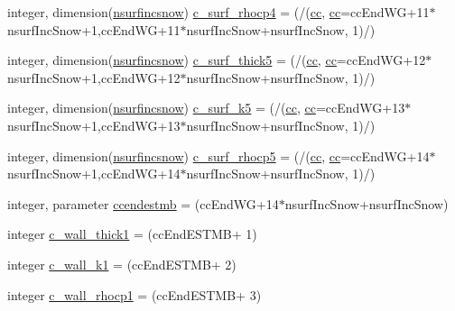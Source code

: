 \begin{DoxyCompactItemize}
\item 
integer, dimension(\hyperlink{namespaceallocatearray_af4d113f332b6759cfa22271140c9162d}{nsurfincsnow}) \hyperlink{namespaceallocatearray_aeb83627142153ed809b4e704bd02f508}{c\+\_\+surf\+\_\+rhocp4} = (/(\hyperlink{namespaceallocatearray_ac863c81704eb507dee10f5e10741e10c}{cc}, \hyperlink{namespaceallocatearray_ac863c81704eb507dee10f5e10741e10c}{cc}=cc\+End\+WG+11$\ast$nsurf\+Inc\+Snow+1,cc\+End\+WG+11$\ast$nsurf\+Inc\+Snow+nsurf\+Inc\+Snow, 1)/)
\item 
integer, dimension(\hyperlink{namespaceallocatearray_af4d113f332b6759cfa22271140c9162d}{nsurfincsnow}) \hyperlink{namespaceallocatearray_a0c826a9f4443bc7d56a37347a79fd81d}{c\+\_\+surf\+\_\+thick5} = (/(\hyperlink{namespaceallocatearray_ac863c81704eb507dee10f5e10741e10c}{cc}, \hyperlink{namespaceallocatearray_ac863c81704eb507dee10f5e10741e10c}{cc}=cc\+End\+WG+12$\ast$nsurf\+Inc\+Snow+1,cc\+End\+WG+12$\ast$nsurf\+Inc\+Snow+nsurf\+Inc\+Snow, 1)/)
\item 
integer, dimension(\hyperlink{namespaceallocatearray_af4d113f332b6759cfa22271140c9162d}{nsurfincsnow}) \hyperlink{namespaceallocatearray_a690e080a92d241ea4f662cecb4f923de}{c\+\_\+surf\+\_\+k5} = (/(\hyperlink{namespaceallocatearray_ac863c81704eb507dee10f5e10741e10c}{cc}, \hyperlink{namespaceallocatearray_ac863c81704eb507dee10f5e10741e10c}{cc}=cc\+End\+WG+13$\ast$nsurf\+Inc\+Snow+1,cc\+End\+WG+13$\ast$nsurf\+Inc\+Snow+nsurf\+Inc\+Snow, 1)/)
\item 
integer, dimension(\hyperlink{namespaceallocatearray_af4d113f332b6759cfa22271140c9162d}{nsurfincsnow}) \hyperlink{namespaceallocatearray_aca21486cca8b4e96b0e6015c03f7a2dc}{c\+\_\+surf\+\_\+rhocp5} = (/(\hyperlink{namespaceallocatearray_ac863c81704eb507dee10f5e10741e10c}{cc}, \hyperlink{namespaceallocatearray_ac863c81704eb507dee10f5e10741e10c}{cc}=cc\+End\+WG+14$\ast$nsurf\+Inc\+Snow+1,cc\+End\+WG+14$\ast$nsurf\+Inc\+Snow+nsurf\+Inc\+Snow, 1)/)
\item 
integer, parameter \hyperlink{namespaceallocatearray_a4a8540d91a102b456a0b5064dcf32db1}{ccendestmb} = (cc\+End\+WG+14$\ast$nsurf\+Inc\+Snow+nsurf\+Inc\+Snow)
\item 
integer \hyperlink{namespaceallocatearray_a9fa538a9bf9934baec62b04d2254711b}{c\+\_\+wall\+\_\+thick1} = (cc\+End\+E\+S\+T\+MB+ 1)
\item 
integer \hyperlink{namespaceallocatearray_ac46d57de0eb86fe7eef4d466bbfabf40}{c\+\_\+wall\+\_\+k1} = (cc\+End\+E\+S\+T\+MB+ 2)
\item 
integer \hyperlink{namespaceallocatearray_a7df439fa2fe23b75ee91c800a099e0ea}{c\+\_\+wall\+\_\+rhocp1} = (cc\+End\+E\+S\+T\+MB+ 3)

\end{DoxyCompactItemize}

